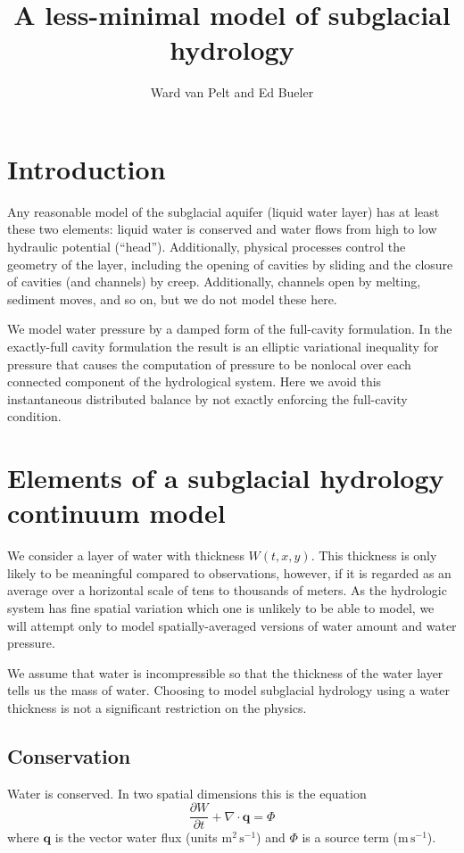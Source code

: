 \documentclass[12pt,final]{amsart}%
\title[]{A less-minimal model of subglacial hydrology}
\author[]{Ward van Pelt and Ed Bueler}
\newcommand\bq{\mathbf{q}}
\newcommand{\Div}{\nabla\cdot}
\begin{document}
\maketitle
\thispagestyle{empty}

\section{Introduction}

Any reasonable model of the subglacial aquifer (liquid water layer) has at least these two elements: liquid water is conserved and water flows from high to low hydraulic potential  (``head'').  Additionally, physical processes control the geometry of the layer, including the opening of cavities by sliding and the closure of cavities (and channels) by creep.  Additionally, channels open by melting, sediment moves, and so on, but we do not model these here.

We model water pressure by a damped form of the full-cavity formulation.  In the exactly-full cavity formulation the result is an elliptic variational inequality \citep{Schoofetal2012} for pressure that causes the computation of pressure to be nonlocal over each connected component of the hydrological system.  Here we avoid this instantaneous distributed balance by not exactly enforcing the full-cavity condition.


\section{Elements of a subglacial hydrology continuum model}

We consider a layer of water with thickness $W(t,x,y)$.  This thickness is only likely to be meaningful compared to observations, however, if it is regarded as an average over a horizontal scale of tens to thousands of meters.  As the hydrologic system has fine spatial variation which one is unlikely to be able to model, we will attempt only to model spatially-averaged versions of water amount and water pressure.

We assume that water is incompressible so that the thickness of the water layer tells us the mass of water.  Choosing to model subglacial hydrology using a water thickness is not a significant restriction on the physics.

\subsection*{Conservation}  Water is conserved.  In two spatial dimensions this is the equation \citep{Clarke05}
\begin{equation} \label{eq:conserve}
\frac{\partial W}{\partial t} + \Div \bq = \Phi
\end{equation}
where $\bq$ is the vector water flux (units $\text{m}^2\,\text{s}^{-1}$) and $\Phi$ is a source term ($\text{m}\,\text{s}^{-1}$).
\end{document}

